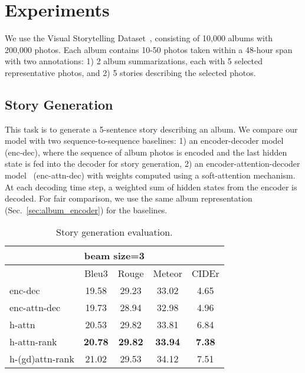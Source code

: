 \section{Experiments}

We use the Visual Storytelling Dataset~\cite{huang2016visual}, consisting of 10,000 albums with 200,000 photos.
Each album contains 10-50 photos taken within a 48-hour span with two annotations: 1) 2 album summarizations, each with 5 selected representative photos, and 2) 5 stories describing the selected photos. 

\subsection{Story Generation}

This task is to generate a 5-sentence story describing an album.
We compare our model with two sequence-to-sequence baselines: 1) an encoder-decoder model (enc-dec), where the sequence of album photos is encoded and the last hidden state is fed into the decoder for story generation,
2) an encoder-attention-decoder model~\cite{xu2015show} (enc-attn-dec) with weights computed using a soft-attention mechanism.
At each decoding time step, a weighted sum of hidden states from the encoder is decoded. For fair comparison, we use the same album representation (Sec.~\ref{sec:album_encoder}) for the baselines.

\begin{table}[t]
\footnotesize
\begin{center}
\begin{tabular}{l|c c c c}
\multicolumn{5}{c}{beam size=3}\\
\hline
& Bleu3 & Rouge & Meteor & CIDEr \\
\hline
enc-dec & 19.58 & 29.23 & 33.02 & 4.65 \\
enc-attn-dec & 19.73 & 28.94 & 32.98 & 4.96 \\
h-attn & 20.53 & 29.82 & 33.81 & 6.84 \\
h-attn-rank & \bf{20.78} & \bf{29.82} & \bf{33.94} & \bf{7.38} \\
\hline
h-(gd)attn-rank & 21.02 & 29.53 & 34.12 & 7.51\\
\hline
\end{tabular}
\end{center}
\vspace{-.4cm}
\caption{Story generation evaluation.}
\vspace{-.1cm}
\label{table:generation}
\end{table}



